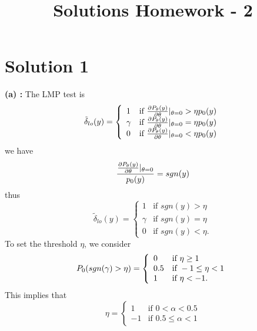 \documentclass[a4paper,english,12pt]{article}
\title{Solutions Homework - 2}
\author{}
\begin{document}
\maketitle
\section{Solution 1}
\textbf{(a) : } The LMP test is
\begin{equation*}
\tilde{\delta}_{lo}(y) =
\left\{
	\begin{array}{ll}
		1  & \mbox{if } \frac{\partial \mathnormal{P}_{\theta}(y)}{\partial \theta} |_{\theta=0}>\eta \mathnormal{p}_0(y)\\
		\gamma & \mbox{if } \frac{\partial \mathnormal{P}_{\theta}(y)}{\partial \theta} |_{\theta=0}=\eta \mathnormal{p}_0(y)\\
		0 & \mbox{if } \frac{\partial \mathnormal{P}_{\theta}(y)}{\partial \theta} |_{\theta=0}<\eta \mathnormal{p}_0(y)\\
	\end{array}
\right.
\end{equation*}
we have
\begin{equation*}
\frac{\frac{\partial \mathnormal{P}_{\theta}(y)}{\partial \theta} |_{\theta=0}}{\mathnormal{p}_0(y)}= sgn(y)
\end{equation*}
thus
\begin{equation*}
\tilde{\delta}_{lo}(y) =
\left\{
	\begin{array}{ll}
		1  & \mbox{if } sgn(y)>\eta\\
		\gamma & \mbox{if } sgn(y)=\eta\\
		0 & \mbox{if } sgn(y)<\eta.
	\end{array}
\right.
\end{equation*}
To set the threshold $\eta$, we consider
\begin{equation*}
\mathnormal{P}_0(sgn(\gamma)>\eta) =
\left\{
	\begin{array}{ll}
		0  & \mbox{if } \eta \geq 1\\
		0.5 & \mbox{if } -1 \leq \eta < 1\\
		1 & \mbox{if } \eta <-1.
	\end{array}
\right.
\end{equation*}
This implies that
\begin{equation*}
\eta =
\left\{
	\begin{array}{ll}
		1  & \mbox{if } 0<\alpha<0.5\\
		-1 & \mbox{if } 0.5\leq \alpha < 1
	\end{array}
\right.
\end{equation*}
\end{document}
